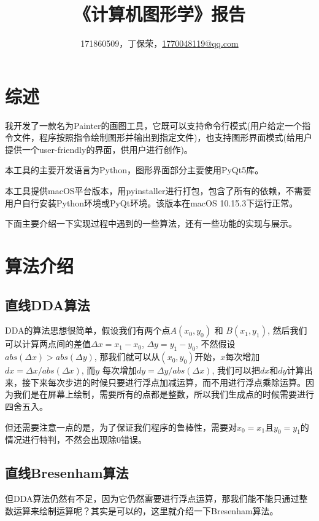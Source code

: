\documentclass[a4paper,UTF8]{article}
\theoremstyle{definition}
\begin{document}
\title{\textbf{《计算机图形学》报告}}
\author{171860509，丁保荣，\href{mailto:1770048119@qq.com}{1770048119@qq.com}}
\maketitle

\tableofcontents

\newpage

\section{综述}
我开发了一款名为Painter的画图工具，它既可以支持命令行模式(用户给定一个指令文件，程序按照指令绘制图形并输出到指定文件)，也支持图形界面模式(给用户提供一个user-friendly的界面，供用户进行创作)。

本工具的主要开发语言为Python，图形界面部分主要使用PyQt5库。

本工具提供macOS平台版本，用pyinstaller进行打包，包含了所有的依赖，不需要用户自行安装Python环境或PyQt环境。该版本在macOS 10.15.3下运行正常。

下面主要介绍一下实现过程中遇到的一些算法，还有一些功能的实现与展示。


\section{算法介绍}

\subsection{直线DDA算法}
DDA的算法思想很简单，假设我们有两个点$A(x_0, y_0)$ 和 $B(x_1, y_1)$, 然后我们可以计算两点间的差值$\Delta x  = x_1 - x_0$, $\Delta y = y_1 - y_0$, 不然假设 $abs(\Delta x) > abs(\Delta y)$, 那我们就可以从$(x_0, y_0)$开始，$x$每次增加$dx = \Delta x / abs(\Delta x)$, 而$y$ 每次增加$dy = \Delta y / abs(\Delta x)$, 我们可以把$dx$和$dy$计算出来，接下来每次步进的时候只要进行浮点加减运算，而不用进行浮点乘除运算。因为我们是在屏幕上绘制，需要所有的点都是整数，所以我们生成点的时候需要进行四舍五入。

但还需要注意一点的是，为了保证我们程序的鲁棒性，需要对$x_0 = x_1$且$y_0 = y_1$的情况进行特判，不然会出现除0错误。


\subsection{直线Bresenham算法}
但DDA算法仍然有不足，因为它仍然需要进行浮点运算，那我们能不能只通过整数运算来绘制运算呢？其实是可以的，这里就介绍一下Bresenham算法\cite{wiki:Bresenham's_line_algorithm}。
\end{document}
